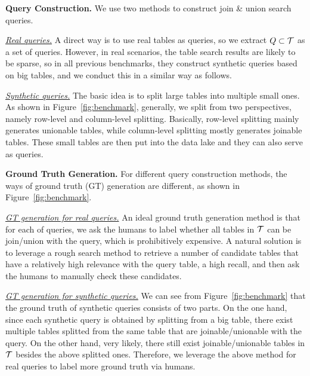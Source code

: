 


\noindent\textbf{Query Construction.} We use two methods to construct join \& union search queries.

\noindent \underline{\textit{Real queries.}}  A direct way  is to use real tables  as queries, so we  extract  $Q\subset \mathcal{T}$ as a set of queries. However, in real scenarios, the table search results are likely to be sparse, so in all previous benchmarks, they construct synthetic queries based on big tables, and we conduct this in a similar way as follows.

\noindent \underline{\textit{Synthetic queries.}} The basic idea is to split large tables into multiple small ones. As shown in Figure~\ref{fig:benchmark}, generally, we split from two perspectives, namely row-level and column-level splitting. 
Basically, row-level splitting mainly generates unionable tables, while column-level splitting mostly generates joinable tables.
These small tables are then put into the data lake and they can also serve as queries.

\noindent\textbf{Ground Truth Generation.} For different query construction methods, the ways of ground truth (GT) generation are different, as shown in Figure~\ref{fig:benchmark}.

 \noindent \underline{\textit{GT generation for real queries.}} An ideal ground truth generation method is that for each of queries, we ask the humans to label whether all tables in $\mathcal{T}$ can be join/union with the query, which is prohibitively expensive. A natural solution is to leverage a rough search  method to retrieve a number of candidate tables that have a relatively high relevance with the query table, \ie a high recall, and then ask the humans to manually check these candidates.
 
 \noindent \underline{\textit{GT generation for synthetic queries.}} We can see from  Figure~\ref{fig:benchmark} that the ground truth of synthetic queries consists of two parts. 
 On the one hand, since each synthetic query is obtained by splitting from a big table, there exist multiple tables splitted from the same table that are joinable/unionable with the query. 
  On the other hand, very likely, there  still exist joinable/unionable tables in $\mathcal{T}$ besides the above  splitted ones.  Therefore, we leverage the above method for  real queries to label more ground truth via humans.





